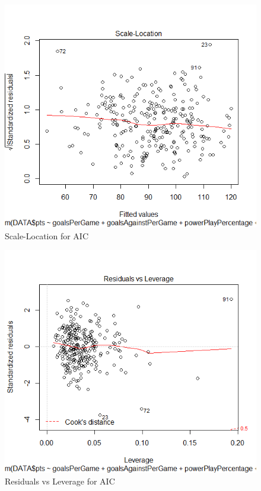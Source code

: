 \documentclass{beamer}
\begin{document}
\begin{frame}
	\begin{figure}
		\centering
		\includegraphics[width=0.7\linewidth]{AIC3}
		\caption{Scale-Location for AIC}
		\label{fig:Scale-Location for AIC}
	\end{figure}
\end{frame}
\begin{frame}
	\begin{figure}
		\centering
		\includegraphics[width=0.7\linewidth]{AIC4}
		\caption{Residuals vs Leverage for AIC}
		\label{fig:Residuals vs Leverage for AIC}
	\end{figure}
\end{frame}
\end{document}
